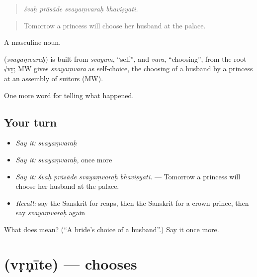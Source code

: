 \begin{quote}
   
\end{quote}

\begin{quote}
\emph{śvaḥ prāsāde svayaṃvaraḥ bhaviṣyati.}
\end{quote}

\begin{quote}
Tomorrow a princess will choose her husband at the palace.
\end{quote}

A masculine noun.

\begin{cousinweb}
\textbf{} (\emph{svayaṃvaraḥ}) is built from \emph{svayam}, \textquotedblleft{}self\textquotedblright{}, and \emph{vara}, \textquotedblleft{}choosing\textquotedblright{}, from the root √vṛ; MW gives \emph{svayaṃvara} as self-choice, the choosing of a husband by a princess at an assembly of suitors (MW).
\end{cousinweb}

\begin{grammarlens}[title={What you've built}]
One more word for telling what happened.
\end{grammarlens}

\subsection*{Your turn}
\begin{itemize}
\raggedright
  \item \emph{Say it:} \emph{svayaṃvaraḥ}
  \item \emph{Say it:} \emph{svayaṃvaraḥ}, once more
  \item \emph{Say it:} \emph{śvaḥ prāsāde svayaṃvaraḥ bhaviṣyati.} — Tomorrow a princess will choose her husband at the palace.
  \item \emph{Recall:} say the Sanskrit for reaps, then the Sanskrit for a crown prince, then say \emph{svayaṃvaraḥ} again
\end{itemize}

\begin{tcolorbox}[breakable,colback=teal!4,colframe=teal!35!black,title={Before you move on}]
What does  mean? (\textquotedblleft{}A bride's choice of a husband\textquotedblright{}.) Say it once more.
\end{tcolorbox}
\section[\texorpdfstring{\sk{वृणीते} (vṛṇīte)}{वृणीते (vṛṇīte)}]{ (vṛṇīte) — chooses}

